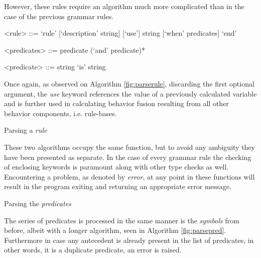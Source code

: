 However, these rules require an algorithm much more complicated than in the case of the previous grammar rules.
\begin{grammar}
<rule> ::= `rule' [`description' string] [`use'] string [`when' predicates] `end'

<predicates> ::= predicate (`and' predicate)*

<predicate> ::= string `is' string
\end{grammar}

Once again, as observed on Algorithm \ref{fig:parserule}, discarding the first optional argument, the \textit{use} keyword references the value of a previously calculated variable and is further used  in calculating behavior fusion resulting from all other behavior components, i.e. rule-bases.

\vskip 0.6cm
\begin{algorithm}[H]
\caption{Parsing a \textit{rule}}
\label{fig:parserule}
\end{algorithm}
\vskip 0.6cm

These two algorithms occupy the same function, but to avoid any ambiguity they have been presented as separate. In the case of every grammar rule the checking of enclosing keywords is paramount along with other type checks as well. Encountering a problem, as denoted by \textit{error},  at any point in these functions will result in the program exiting and returning an appropriate error message.

\vskip 0.6cm
\begin{algorithm}[H]
\caption{Parsing the \textit{predicates}}
\label{fig:parsepred}
\end{algorithm}
\vskip 0.6cm

The series of predicates is processed in the same manner is the \textit{symbols} from before, albeit with a longer algorithm, seen in Algorithm \ref{fig:parsepred}. Furthermore in case any antecedent is already present in the list of predicates, in other words, it is a duplicate predicate, an error is raised.

